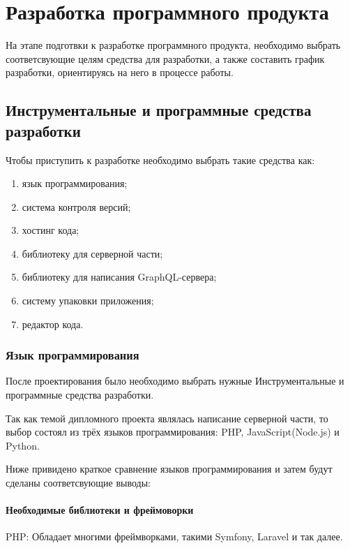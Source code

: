 \section{Разработка программного продукта}

На этапе подготвки к разработке программного продукта, необходимо выбрать соответсвующие целям средства для разработки, а также составить
график разработки, ориентируясь на него в процессе работы.

\subsection{Инструментальные и программные средства разработки}

Чтобы приступить к разработке необходимо выбрать такие средства как:

\begin{enumerate}
    \item язык программирования;
    \item система контроля версий;
    \item хостинг кода;
    \item библиотеку для серверной части;
    \item библиотеку для написания GraphQL-сервера;
    \item систему упаковки приложения;
    \item редактор кода.
\end{enumerate}

\subsubsection{Язык программирования}

После проектирования было необходимо выбрать нужные Инструментальные и программные средства разработки.

Так как темой дипломного проекта являлась написание серверной части, то выбор состоял из трёх языков программирования: PHP, JavaScript(Node.js) и Python.

Ниже привидено краткое сравнение языков программирования и затем будут сделаны соответсвующие выводы:

\paragraph{Необходимые библиотеки и фреймоворки}

PHP: Обладает многими
фреймворками, такими
Symfony, Laravel и так
далее.

